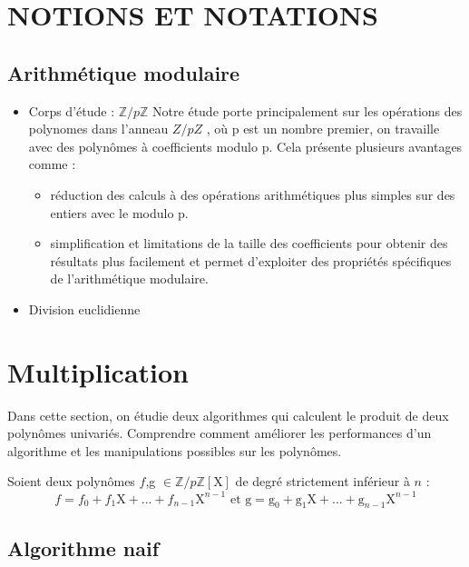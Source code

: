 \documentclass[a4paper]{article}
\begin{document}
\section{NOTIONS ET NOTATIONS}


\subsection{Arithmétique modulaire}

\begin{itemize}[label=$\star$]
 \item Corps d'étude : ${\mathbb{Z}/p \mathbb{Z}}$
Notre étude porte principalement sur les opérations des polynomes dans l'anneau $Z/pZ$ , où p est un nombre premier, on travaille avec des polynômes à coefficients modulo p. Cela présente plusieurs avantages comme :
	\begin{itemize}

  		\item réduction des calculs à des opérations arithmétiques plus simples sur des entiers avec le modulo p.
  		\item simplification et limitations de la taille des coefficients pour obtenir des résultats plus facilement et permet d'exploiter des propriétés spécifiques de l'arithmétique modulaire.
  
	\end{itemize}
	
 \item Division euclidienne

\end{itemize}

\section{Multiplication}

Dans cette section, on étudie deux algorithmes qui calculent le produit de deux polynômes univariés.
Comprendre comment améliorer les performances d'un algorithme et les manipulations possibles sur les polynômes.


Soient deux polynômes $f$,g $\in \mathbb{Z}/p\mathbb{Z}[\mathrm{X}]$ de degré strictement inférieur à $n$ :
\[
f=f_0+f_1\mathrm{X}+...+f_{n-1}\mathrm{X}^{n-1}\text{ et g}=\mathrm{g}_0+\mathrm{g}_1\mathrm{X}+...+\mathrm{g}_{n-1}\mathrm{X}^{n-1}
\]

\subsection{Algorithme naif}
\end{document}
